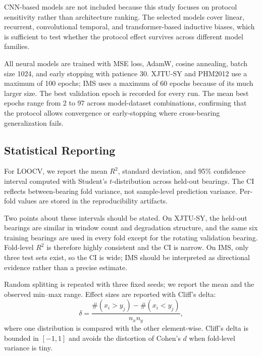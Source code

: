 \documentclass[5p,twocolumn]{elsarticle}
\begin{document}
CNN-based models are not included because this study focuses on protocol sensitivity rather than architecture ranking. The selected models cover linear, recurrent, convolutional temporal, and transformer-based inductive biases, which is sufficient to test whether the protocol effect survives across different model families.

All neural models are trained with MSE loss, AdamW, cosine annealing, batch size 1024, and early stopping with patience 30. XJTU-SY and PHM2012 use a maximum of 100 epochs; IMS uses a maximum of 60 epochs because of its much larger size. The best validation epoch is recorded for every run. The mean best epochs range from 2 to 97 across model-dataset combinations, confirming that the protocol allows convergence or early-stopping where cross-bearing generalization fails.

\subsection{Statistical Reporting}
For LOOCV, we report the mean $R^2$, standard deviation, and 95\% confidence interval computed with Student's $t$-distribution across held-out bearings. The CI reflects between-bearing fold variance, not sample-level prediction variance. Per-fold values are stored in the reproducibility artifacts.

Two points about these intervals should be stated. On XJTU-SY, the held-out bearings are similar in window count and degradation structure, and the same six training bearings are used in every fold except for the rotating validation bearing. Fold-level $R^2$ is therefore highly consistent and the CI is narrow. On IMS, only three test sets exist, so the CI is wide; IMS should be interpreted as directional evidence rather than a precise estimate.

Random splitting is repeated with three fixed seeds; we report the mean and the observed min--max range. Effect sizes are reported with Cliff's delta:
\begin{equation}
\delta = \frac{\#(x_i > y_j) - \#(x_i < y_j)}{n_x n_y},
\label{eq:cliff}
\end{equation}
where one distribution is compared with the other element-wise. Cliff's delta is bounded in $[-1, 1]$ and avoids the distortion of Cohen's $d$ when fold-level variance is tiny.
\end{document}
